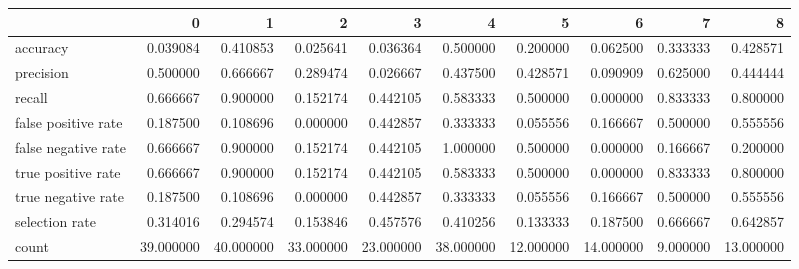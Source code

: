 \begin{tabular}{lrrrrrrrrr}
\toprule
{} &          0 &          1 &          2 &          3 &          4 &          5 &          6 &         7 &          8 \\
\midrule
accuracy            &   0.039084 &   0.410853 &   0.025641 &   0.036364 &   0.500000 &   0.200000 &   0.062500 &  0.333333 &   0.428571 \\
precision           &   0.500000 &   0.666667 &   0.289474 &   0.026667 &   0.437500 &   0.428571 &   0.090909 &  0.625000 &   0.444444 \\
recall              &   0.666667 &   0.900000 &   0.152174 &   0.442105 &   0.583333 &   0.500000 &   0.000000 &  0.833333 &   0.800000 \\
false positive rate &   0.187500 &   0.108696 &   0.000000 &   0.442857 &   0.333333 &   0.055556 &   0.166667 &  0.500000 &   0.555556 \\
false negative rate &   0.666667 &   0.900000 &   0.152174 &   0.442105 &   1.000000 &   0.500000 &   0.000000 &  0.166667 &   0.200000 \\
true positive rate  &   0.666667 &   0.900000 &   0.152174 &   0.442105 &   0.583333 &   0.500000 &   0.000000 &  0.833333 &   0.800000 \\
true negative rate  &   0.187500 &   0.108696 &   0.000000 &   0.442857 &   0.333333 &   0.055556 &   0.166667 &  0.500000 &   0.555556 \\
selection rate      &   0.314016 &   0.294574 &   0.153846 &   0.457576 &   0.410256 &   0.133333 &   0.187500 &  0.666667 &   0.642857 \\
count               &  39.000000 &  40.000000 &  33.000000 &  23.000000 &  38.000000 &  12.000000 &  14.000000 &  9.000000 &  13.000000 \\
\bottomrule
\end{tabular}
